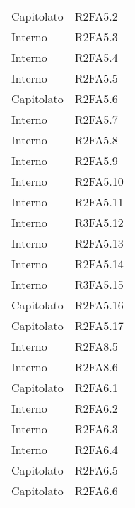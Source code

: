 {\begin{longtable}{ C{4cm} C{4cm}}
Capitolato & R2FA5.2\\


Interno & R2FA5.3\\

Interno & R2FA5.4\\

Interno & R2FA5.5\\

Capitolato & R2FA5.6\\

Interno & R2FA5.7\\

Interno & R2FA5.8\\

Interno & R2FA5.9\\

Interno & R2FA5.10\\

Interno & R2FA5.11\\


Interno & R3FA5.12\\

Interno & R2FA5.13\\

Interno & R2FA5.14\\

Interno & R3FA5.15\\

Capitolato & R2FA5.16\\

Capitolato & R2FA5.17\\

Interno & R2FA8.5\\

Interno & R2FA8.6\\

Capitolato & R2FA6.1\\


Interno & R2FA6.2\\

Interno & R2FA6.3\\

Interno & R2FA6.4\\

Capitolato & R2FA6.5\\

Capitolato & R2FA6.6\\


\end{longtable}}
